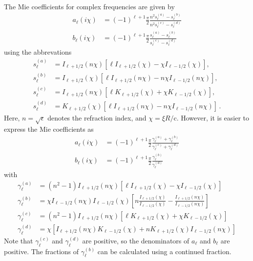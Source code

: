 \documentclass[superscriptaddress,prb]{revtex4-1}
\newcommand{\imag}{i} %
\newcommand{\sol}{\mathrm{c}} %
\begin{document}
The Mie coefficients for complex frequencies are given by
\begin{align}
a_\ell(\imag\chi) &= (-1)^{\ell+1} \frac{\pi}{2} \frac{n^2 s_\ell^{(a)} - s_\ell^{(b)}}{n^2 s_\ell^{(c)} - s_\ell^{(d)}} \\
b_\ell(\imag\chi) &= (-1)^{\ell+1} \frac{\pi}{2} \frac{s_\ell^{(a)} - s_\ell^{(b)}}{s_\ell^{(c)} - s_\ell^{(d)}}
\end{align}
using the abbrevations
\begin{align}
s_\ell^{(a)} &= I_{\ell+1/2}(n\chi) \left[\ell I_{\ell+1/2}(\chi)  -  \chi I_{\ell-1/2}(\chi) \right], \\
s_\ell^{(b)} &= I_{\ell+1/2}(\chi)  \left[\ell I_{\ell+1/2}(n\chi) - n\chi I_{\ell-1/2}(n\chi)\right], \\
s_\ell^{(c)} &= I_{\ell+1/2}(n\chi) \left[\ell K_{\ell+1/2}(\chi)  +  \chi K_{\ell-1/2}(\chi) \right], \\
s_\ell^{(d)} &= K_{\ell+1/2}(\chi)  \left[\ell I_{\ell+1/2}(n\chi) - n\chi I_{\ell-1/2}(n\chi)\right] \,.
\end{align}
Here, $n=\sqrt{\epsilon}$ denotes the refraction index, and $\chi=\xi R/\sol$. However, it is easier to express
the Mie coefficients as
\begin{align}
a_\ell(\imag\chi) &= (-1)^{\ell+1} \frac{\pi}{2} \frac{\gamma^{(a)}_\ell+\gamma^{(b)}_\ell}{\gamma^{(c)}_\ell+\gamma^{(d)}_\ell} \\
b_\ell(\imag\chi) &= (-1)^{\ell+1} \frac{\pi}{2} \frac{\gamma^{(b)}_\ell}{\gamma^{(d)}_\ell}
\end{align}
with
\begin{align}
\gamma_\ell^{(a)} &= (n^2-1) I_{\ell+1/2}(n\chi) \left[\ell I_{\ell+1/2}(\chi) - \chi I_{\ell-1/2}(\chi)\right] \\
\gamma_\ell^{(b)} &= \chi I_{\ell-1/2}(n\chi) I_{\ell-1/2}(\chi) \left[n\frac{I_{\ell+1/2}(\chi)}{I_{\ell-1/2}(\chi)}-\frac{I_{\ell+1/2}(n\chi)}{I_{\ell-1/2}(n\chi)}\right] \\
\gamma_\ell^{(c)} &= (n^2-1) I_{\ell+1/2}(n\chi) \left[\ell K_{\ell+1/2}(\chi) + \chi K_{\ell-1/2}(\chi)\right] \\
\gamma_\ell^{(d)} &= \chi \left[I_{\ell+1/2}(n\chi) K_{\ell-1/2}(\chi) + n K_{\ell+1/2}(\chi) I_{\ell-1/2}(n\chi)\right]
\end{align}
Note that $\gamma_\ell^{(c)}$ and $\gamma_\ell^{(d)}$ are positive, so the
denominators of $a_\ell$ and $b_\ell$ are positive. The fractions of
$\gamma_\ell^{(b)}$ can be calculated using a continued fraction.
\end{document}
